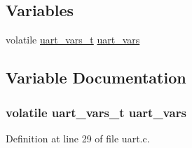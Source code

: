 \subsection*{Variables}
\begin{DoxyCompactItemize}
\item 
volatile \hyperlink{structuart__vars__t}{uart\+\_\+vars\+\_\+t} \hyperlink{iot-lab___a8-_m3_2uart_8c_a53a0a6b0f077b2b1ce06c87d57344adb}{uart\+\_\+vars}
\end{DoxyCompactItemize}


\subsection{Variable Documentation}
\subsubsection[{\texorpdfstring{uart\+\_\+vars}{uart_vars}}]{\setlength{\rightskip}{0pt plus 5cm}volatile {\bf uart\+\_\+vars\+\_\+t} uart\+\_\+vars}\hypertarget{iot-lab___a8-_m3_2uart_8c_a53a0a6b0f077b2b1ce06c87d57344adb}{}\label{iot-lab___a8-_m3_2uart_8c_a53a0a6b0f077b2b1ce06c87d57344adb}


Definition at line 29 of file uart.\+c.

